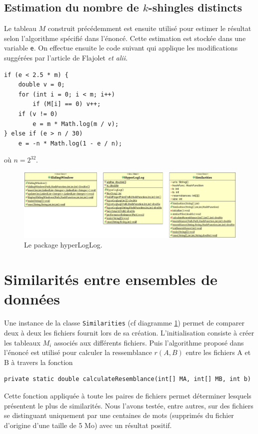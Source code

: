 \documentclass[12pt,a4paper,titlepage]{article}
\newcommand{\class}[1]{\texttt{#1}}
\begin{document}
\subsection{Estimation du nombre de $k$-shingles distincts}
Le tableau $M$ construit précédemment est ensuite utilisé pour estimer le résultat selon l'algorithme spécifié dans l'énoncé. Cette estimation est stockée dans une variable \class{e}. On effectue ensuite le code suivant qui applique les modifications suggérées par l'article de Flajolet \textit{et alii}.
\begin{lstlisting}
if (e < 2.5 * m) {
    double v = 0;
    for (int i = 0; i < m; i++)
    	if (M[i] == 0) v++;
    if (v != 0)
    	e = m * Math.log(m / v);
} else if (e > n / 30)
    e = -n * Math.log(1 - e / n);
\end{lstlisting}
où $n = 2^{32}$.

\begin{figure}
	\label{fig:hyperLogLogPackage}
	\centering
	\includegraphics[scale=0.50, angle=90]{../Java Workspace/Test Hash/hyperLogLogPackage.png}
	\caption{Le package hyperLogLog.}
\end{figure}


\newpage
\section{Similarités entre ensembles de données}
Une instance de la classe \class{Similarities} (cf diagramme \ref{fig:hyperLogLogPackage}) permet de comparer deux à deux les fichiers fournit lors de sa création. L'initialisation consiste à créer les tableaux $M_i$ associés aux différents fichiers. Puis l'algorithme proposé dans l'énoncé est utilisé pour calculer la ressemblance $r(A,B)$ entre les fichiers A et B à travers la fonction
\begin{lstlisting}
private static double calculateResemblance(int[] MA, int[] MB, int b)
\end{lstlisting}
Cette fonction appliquée à toute les paires de fichiers permet déterminer lesquels présentent le plus de similarités. Nous l'avons testée, entre autres, sur des fichiers se distinguant uniquement par une centaines de mots (supprimés du fichier d'origine d'une taille de 5 Mo) avec un résultat positif.
\end{document}

